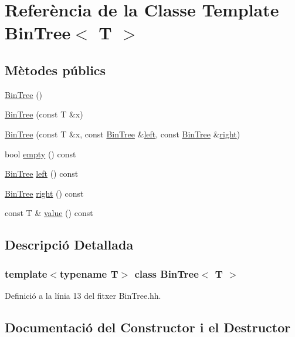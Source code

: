 \hypertarget{class_bin_tree}{}\section{Referència de la Classe Template Bin\+Tree$<$ T $>$}
\label{class_bin_tree}
\subsection*{Mètodes públics}
\begin{DoxyCompactItemize}
\item 
\hyperlink{class_bin_tree_a47eef22d29cd023449d97c073c08e5b6}{Bin\+Tree} ()
\item 
\hyperlink{class_bin_tree_a1ab686e0bcf990093ff91fe71744c1a4}{Bin\+Tree} (const T \&x)
\item 
\hyperlink{class_bin_tree_adb7eeff76d08130c943b36af215eb521}{Bin\+Tree} (const T \&x, const \hyperlink{class_bin_tree}{Bin\+Tree} \&\hyperlink{class_bin_tree_a82108db4c1b08d1f111027788c196d4e}{left}, const \hyperlink{class_bin_tree}{Bin\+Tree} \&\hyperlink{class_bin_tree_aff8e96651b27284c329667b5ad3e4d0b}{right})
\item 
bool \hyperlink{class_bin_tree_a74cda259ba5c25b8ee38ed4dc33e4fad}{empty} () const
\item 
\hyperlink{class_bin_tree}{Bin\+Tree} \hyperlink{class_bin_tree_a82108db4c1b08d1f111027788c196d4e}{left} () const
\item 
\hyperlink{class_bin_tree}{Bin\+Tree} \hyperlink{class_bin_tree_aff8e96651b27284c329667b5ad3e4d0b}{right} () const
\item 
const T \& \hyperlink{class_bin_tree_a734e785b089c87b49187ee7c58edf5f3}{value} () const
\end{DoxyCompactItemize}


\subsection{Descripció Detallada}
\subsubsection*{template$<$typename T$>$\newline
class Bin\+Tree$<$ T $>$}



Definició a la línia 13 del fitxer Bin\+Tree.\+hh.



\subsection{Documentació del Constructor i el Destructor}
\mbox{\label{class_bin_tree_a47eef22d29cd023449d97c073c08e5b6}} 
